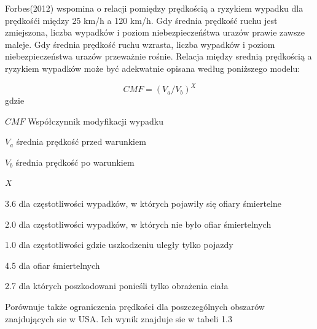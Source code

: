 Forbes(2012) wspomina o relacji pomiędzy prędkością a ryzykiem wypadku dla prędkośći między 25 km/h a 120 km/h. Gdy średnia prędkość ruchu jest zmiejszona, liczba wypadków i  poziom niebezpieczeńśtwa urazów prawie zawsze maleje. Gdy średnia prędkość ruchu wzrasta, liczba wypadków i poziom niebezpieczeństwa urazów  przeważnie rośnie. Relacja między srednią prędkością a ryzykiem wypadków może być adekwatnie opisana według poniższego modelu:

\begin{equation}
CMF = (V_a / V_b)^X
\end{equation}
gdzie
\begin{eqwhere}[2cm]
	\item[$CMF$] Współczynnik modyfikacji wypadku
	\item[$V_a$] średnia prędkość przed warunkiem
	\item[$V_b$] średnia prędkość po warunkiem
	\item[$X$] \begin{itemize}
		3.6 dla częstotliwości wypadków, w których pojawiły się ofiary śmiertelne
		
		2.0 dla częstotliwości wypadków, w których nie było ofiar śmiertelnych
		
		1.0 dla częstotliwości gdzie uszkodzeniu uległy tylko pojazdy
		
		4.5 dla ofiar śmiertelnych
		
		2.7 dla których poszkodowani ponieśli tylko obrażenia ciała
	\end{itemize}

\end{eqwhere}
Porównuje także ograniczenia prędkości dla poszczególnych obszarów znajdujących sie w USA. Ich wynik znajduje sie w tabeli 1.3

